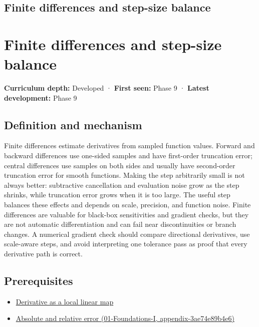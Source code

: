 \hypertarget{appendix-e2d7b4f2161d}{}
\section*{Finite differences and step-size balance}
\chapter{Finite differences and step-size balance}\label{appendix-e2d7b4f2161d-finite-differences-and-step-size-balance}

\textbf{Curriculum depth:} Developed · \textbf{First seen:} Phase 9 · \textbf{Latest development:} Phase 9

\section{Definition and mechanism}\label{appendix-e2d7b4f2161d-definition-and-mechanism}

Finite differences estimate derivatives from sampled function values. Forward and backward differences use one-sided samples and have first-order truncation error; central differences use samples on both sides and usually have second-order truncation error for smooth functions. Making the step arbitrarily small is not always better: subtractive cancellation and evaluation noise grow as the step shrinks, while truncation error grows when it is too large. The useful step balances these effects and depends on scale, precision, and function noise. Finite differences are valuable for black-box sensitivities and gradient checks, but they are not automatic differentiation and can fail near discontinuities or branch changes. A numerical gradient check should compare directional derivatives, use scale-aware steps, and avoid interpreting one tolerance pass as proof that every derivative path is correct.

\section{Prerequisites}\label{appendix-e2d7b4f2161d-prerequisites}

\begin{itemize}
\tightlist
\item
  \hyperref[appendix-7bc181935c42]{Derivative as a local linear map}
\item
  \href{../01-Foundations-I/main.pdf\#nameddest=appendix-3ae74e89b4e6}{Absolute and relative error (01-Foundations-I, appendix-3ae74e89b4e6)}
\end{itemize}


